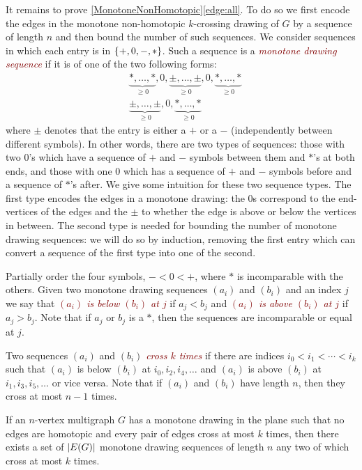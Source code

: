 \documentclass[a4paper,11pt]{article}
\renewcommand{\geq}{\geqslant}
\DeclarePairedDelimiter{\abs}{\lvert}{\rvert} %
\DeclarePairedDelimiter{\set}{\lbrace}{\rbrace} %
\newcommand{\defn}[1]{\textcolor{Maroon}{\emph{#1}}}
\begin{document}
It remains to prove \cref{MonotoneNonHomotopic}\ref{edge:all}. To do so we first encode the edges in the monotone non-homotopic $k$-crossing drawing of $G$ by a sequence of length $n$ and then bound the number of such sequences. We consider sequences in which each entry is in $\set{+,0,-,\ast}$. Such a sequence is a \defn{monotone drawing sequence} if it is of one of the two following forms:
\begin{align*}
    & \underbrace{\ast, \dotsc, \ast}_{\geq 0}, 0, \underbrace{\pm, \dotsc, \pm}_{\geq 0}, 0, \underbrace{\ast, \dotsc, \ast}_{\geq 0} \\[4pt]
    & \underbrace{\pm, \dotsc, \pm}_{\geq 0}, 0, \underbrace{\ast, \dotsc, \ast}_{\geq 0}
\end{align*}
where $\pm$ denotes that the entry is either a $+$ or a $-$ (independently between different symbols). In other words, there are two types of sequences: those with two 0's which have a sequence of $+$ and $-$ symbols between them and $\ast$'s at both ends, and those with one 0 which has a sequence of $+$ and $-$ symbols before and a sequence of $\ast$'s after. We give some intuition for these two sequence types. The first type encodes the edges in a monotone drawing: the 0s correspond to the end-vertices of the edges and the $\pm$ to whether the edge is above or below the vertices in between. The second type is needed for bounding the number of monotone drawing sequences: we will do so by induction, removing the first entry which can convert a sequence of the first type into one of the second.

Partially order the four symbols, $- < 0 < +$, where $\ast$ is incomparable with the others. Given two monotone drawing sequences $(a_i)$ and $(b_i)$ and an index $j$ we say that \defn{$(a_i)$ is below $(b_i)$ at $j$} if $a_j < b_j$ and \defn{$(a_i)$ is above $(b_i)$ at $j$} if $a_j > b_j$. Note that if $a_j$ or $b_j$ is a $\ast$, then the sequences are incomparable or equal at $j$.

Two sequences $(a_i)$ and $(b_i)$ \defn{cross $k$ times} if there are indices $i_0 < i_1 < \dotsb < i_k$ such that $(a_i)$ is below $(b_i)$ at $i_0, i_2, i_4, \dotsc$ and $(a_i)$ is above $(b_i)$ at $i_1, i_3, i_5, \dotsc$ or vice versa. Note that if $(a_i)$ and $(b_i)$ have length $n$, then they cross at most $n - 1$ times.

\begin{lemma}
\label{drawingtosequences}
If an $n$-vertex multigraph $G$ has a monotone drawing in the plane such that no edges are homotopic and every pair of edges cross at most $k$ times, then there exists a set of $\abs{E(G)}$ monotone drawing sequences of length $n$ any two of which cross at most $k$ times. 
\end{lemma}
\end{document}
